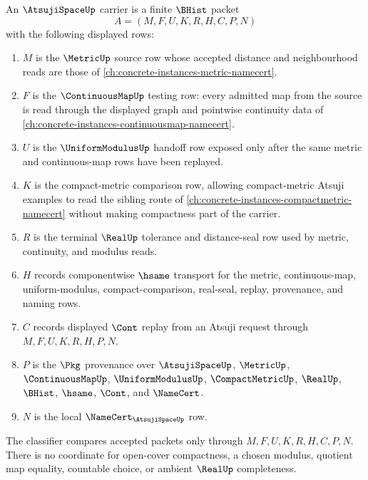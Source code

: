 \begin{definition}
\label{def:atsuji-space-carrier}
An $\AtsujiSpaceUp$ carrier is a finite $\BHist$ packet
$$
A=(M,F,U,K,R,H,C,P,N)
$$
with the following displayed rows:
\begin{enumerate}
\item $M$ is the $\MetricUp$ source row whose accepted distance and neighbourhood reads are those of \autoref{ch:concrete-instances-metric-namecert}.
\item $F$ is the $\ContinuousMapUp$ testing row: every admitted map from the source is read through the displayed graph and pointwise continuity data of \autoref{ch:concrete-instances-continuousmap-namecert}.
\item $U$ is the $\UniformModulusUp$ handoff row exposed only after the same metric and continuous-map rows have been replayed.
\item $K$ is the compact-metric comparison row, allowing compact-metric Atsuji examples to read the sibling route of \autoref{ch:concrete-instances-compactmetric-namecert} without making compactness part of the carrier.
\item $R$ is the terminal $\RealUp$ tolerance and distance-seal row used by metric, continuity, and modulus reads.
\item $H$ records componentwise $\hsame$ transport for the metric, continuous-map, uniform-modulus, compact-comparison, real-seal, replay, provenance, and naming rows.
\item $C$ records displayed $\Cont$ replay from an Atsuji request through $M,F,U,K,R,H,P,N$.
\item $P$ is the $\Pkg$ provenance over $\AtsujiSpaceUp$, $\MetricUp$, $\ContinuousMapUp$, $\UniformModulusUp$, $\CompactMetricUp$, $\RealUp$, $\BHist$, $\hsame$, $\Cont$, and $\NameCert$.
\item $N$ is the local $\NameCert_{\AtsujiSpaceUp}$ row.
\end{enumerate}
The classifier compares accepted packets only through $M,F,U,K,R,H,C,P,N$. There is no coordinate for open-cover compactness, a chosen modulus, quotient map equality, countable choice, or ambient $\RealUp$ completeness.
\end{definition}

